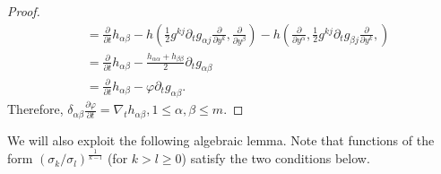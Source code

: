 \documentclass[10pt,a4paper]{amsart}
\newtheorem{lemma}[theorem]{Lemma}
\newcommand{\R}{\ensuremath{\mathbb{R}}}
\newcommand{\pd}[2]{\frac{\partial {#1}}{\partial {#2}}}
\numberwithin{equation}{section}
\begin{document}
\begin{proof}
\[\begin{aligned}
        &= \pd{}{t} h_{\alpha\beta} - h\left(\frac{1}{2}g^{kj}\partial_{t}g_{\alpha j}\pd{}{y^k}, \pd{}{y^\beta}\right)-h\left( \pd{}{y^\alpha}, \frac{1}{2}g^{kj}\partial_{t}g_{\beta j}\pd{}{y^k},\right)\\
        &= \pd{}{t} h_{\alpha\beta} - \frac{h_{\alpha\alpha}+h_{\beta\beta}}{2}\partial_{t}g_{\alpha\beta} \\
        &= \pd{}{t} h_{\alpha\beta} - \varphi\partial_{t}g_{\alpha\beta}.
    \end{aligned}  \] 
    Therefore, \(\delta_{\alpha\beta}\pd{\varphi}{t} = \nabla_t h_{\alpha\beta}, 1\leq \alpha,\beta \leq m\).
\end{proof}

We will also exploit the following algebraic lemma. Note that functions of the form \((\sigma_k / \sigma_l)^{\frac{1}{k-l}}\) (for \(k > l \geq 0\)) satisfy the two conditions below.
\end{document}
